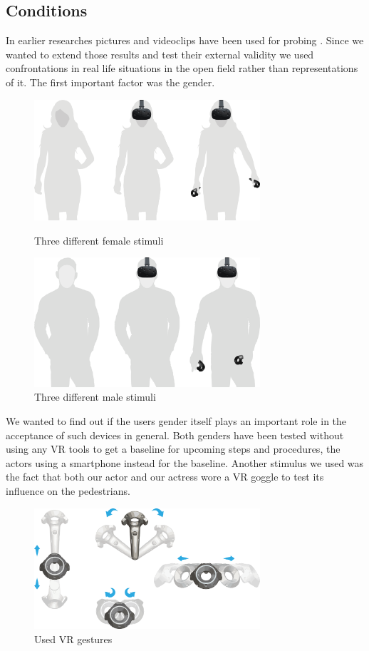 \documentclass[sigchi]{acmart}
\begin{document}
\subsection{Conditions}

In earlier researches pictures and videoclips have been used for probing \cite{schwind2018virtual}. Since we wanted to extend those results and test their external validity we used confrontations in real life situations in the open field rather than representations of it. The first important factor was the gender.

\begin{figure}[h]
\includegraphics[width=84mm]{female_stimuli.png} 
\caption{Three different female stimuli}
\includegraphics[width=84mm]{male_stimuli.png} 
\caption{Three different male stimuli}
\end{figure}

We wanted to find out if the users gender itself plays an important role in the acceptance of such devices in general. Both genders have been tested without using any VR tools to get a baseline for upcoming steps and procedures, the actors using a smartphone instead for the baseline.
Another stimulus we used was the fact that both our actor and our actress wore a VR goggle to test its influence on the pedestrians.

\begin{figure}[h]
\includegraphics[width=84mm]{vr_gestures.png} 
\caption{Used VR gestures}
\end{figure}
\end{document}
